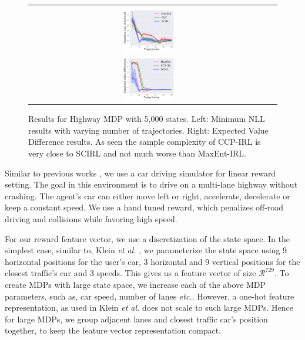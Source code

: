 \documentclass{article}
\def\MSHangBox#1{%
\begin{minipage}[t]{\textwidth}%
\begin{tabbing} %
~\\[-\baselineskip] %
#1 %
\end{tabbing}%
\end{minipage}} %
\begin{document}
\begin{figure}[t]
\centering
  \begin{tabular}{cc}
    \MSHangBox{\includegraphics[width=0.22\textwidth]{images/highway/medium_mdp/test_nll.pdf}}&
    \MSHangBox{\includegraphics[width=0.22\textwidth]{images/highway/medium_mdp/test_evd.pdf}}
    \end{tabular}
    \caption{Results for Highway MDP with 5,000 states. Left: Minimum NLL results with varying number of trajectories. Right: Expected Value Difference results. As seen the sample complexity of CCP-IRL is very close to SCIRL and not much worse than MaxEnt-IRL.}
    \label{fig:img_maxent_vs_ccp_gridworld_macro_cell}
    \vspace{-0.2cm}
\end{figure}


Similar to previous works \cite{abbeel2004apprenticeship, klein2012inverse}, we use a car driving simulator for linear reward setting. The goal in this environment is to drive on a multi-lane highway without crashing. The agent's car can either move left or right, accelerate, decelerate or keep a constant speed. We use a hand tuned reward, which penalizes off-road driving and collisions while favoring high speed. 

For our reward feature vector, we use a discretization of the state space. In the simplest case, similar to, Klein \emph{et al.} , we parameterize the state space using 9 horizontal positions for the user's car, 3 horizontal and 9 vertical positions for the closest traffic's car and 3 speeds. This gives us a feature vector of size $\mathcal{R}^{729}$. To create MDPs with large state space, we increase each of the above MDP parameters, such as, car speed, number of lanes \emph{etc.}. However, a one-hot feature representation, as used in Klein \emph{et al.} does not scale to such large MDPs. Hence for large MDPs, we group adjacent lanes and closest traffic car's position together, to keep the feature vector representation compact.
\end{document}
